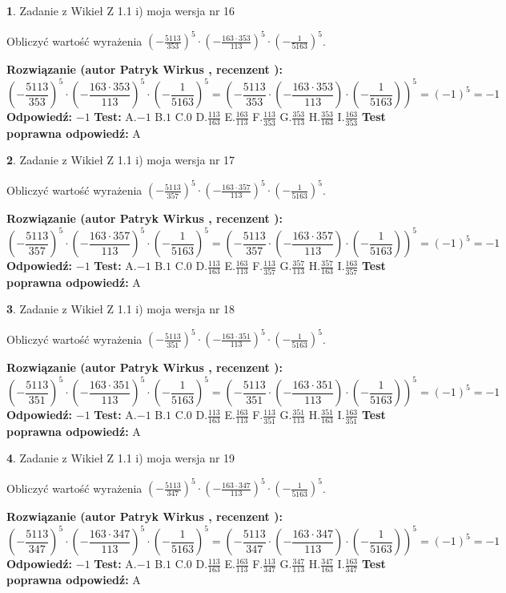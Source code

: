 \documentclass[12pt, a4paper]{article}
\theoremstyle{definition} %
\newtheorem{zad}{}
\newcommand{\zadStart}[1]{\begin{zad}#1\newline}
\newcommand{\zadStop}{\end{zad}}
\newcommand{\rozwStart}[2]{\noindent \textbf{Rozwiązanie (autor #1 , recenzent #2): }\newline}
\newcommand{\rozwStop}{\newline}
\newcommand{\odpStart}{\noindent \textbf{Odpowiedź:}\newline}
\newcommand{\odpStop}{\newline}
\newcommand{\testStart}{\noindent \textbf{Test:}\newline}
\newcommand{\testStop}{\newline}
\newcommand{\kluczStart}{\noindent \textbf{Test poprawna odpowiedź:}\newline}
\newcommand{\kluczStop}{\newline}
\begin{document}
\zadStart{Zadanie z Wikieł Z 1.1 i) moja wersja nr 16}

Obliczyć wartość wyrażenia $(-\frac{5113}{353})^{5} \cdot (-\frac{163 \cdot 353}{113})^{5} \cdot (-\frac{1}{5163})^{5}$.
\zadStop
\rozwStart{Patryk Wirkus}{}
$$(-\frac{5113}{353})^{5} \cdot (-\frac{163 \cdot 353}{113})^{5} \cdot (-\frac{1}{5163})^{5} = (-\frac{5113}{353} \cdot (-\frac{163 \cdot 353}{113}) \cdot (-\frac{1}{5163}))^{5} = (-1)^{5} = -1$$
\rozwStop
\odpStart
$-1$
\odpStop
\testStart
A.$-1$ B.$1$ C.$0$ D.$\frac{113}{163}$ E.$\frac{163}{113}$
F.$\frac{113}{353}$ G.$\frac{353}{113}$
H.$\frac{353}{163}$
I.$\frac{163}{353}$
\testStop
\kluczStart
A
\kluczStop



\zadStart{Zadanie z Wikieł Z 1.1 i) moja wersja nr 17}

Obliczyć wartość wyrażenia $(-\frac{5113}{357})^{5} \cdot (-\frac{163 \cdot 357}{113})^{5} \cdot (-\frac{1}{5163})^{5}$.
\zadStop
\rozwStart{Patryk Wirkus}{}
$$(-\frac{5113}{357})^{5} \cdot (-\frac{163 \cdot 357}{113})^{5} \cdot (-\frac{1}{5163})^{5} = (-\frac{5113}{357} \cdot (-\frac{163 \cdot 357}{113}) \cdot (-\frac{1}{5163}))^{5} = (-1)^{5} = -1$$
\rozwStop
\odpStart
$-1$
\odpStop
\testStart
A.$-1$ B.$1$ C.$0$ D.$\frac{113}{163}$ E.$\frac{163}{113}$
F.$\frac{113}{357}$ G.$\frac{357}{113}$
H.$\frac{357}{163}$
I.$\frac{163}{357}$
\testStop
\kluczStart
A
\kluczStop



\zadStart{Zadanie z Wikieł Z 1.1 i) moja wersja nr 18}

Obliczyć wartość wyrażenia $(-\frac{5113}{351})^{5} \cdot (-\frac{163 \cdot 351}{113})^{5} \cdot (-\frac{1}{5163})^{5}$.
\zadStop
\rozwStart{Patryk Wirkus}{}
$$(-\frac{5113}{351})^{5} \cdot (-\frac{163 \cdot 351}{113})^{5} \cdot (-\frac{1}{5163})^{5} = (-\frac{5113}{351} \cdot (-\frac{163 \cdot 351}{113}) \cdot (-\frac{1}{5163}))^{5} = (-1)^{5} = -1$$
\rozwStop
\odpStart
$-1$
\odpStop
\testStart
A.$-1$ B.$1$ C.$0$ D.$\frac{113}{163}$ E.$\frac{163}{113}$
F.$\frac{113}{351}$ G.$\frac{351}{113}$
H.$\frac{351}{163}$
I.$\frac{163}{351}$
\testStop
\kluczStart
A
\kluczStop



\zadStart{Zadanie z Wikieł Z 1.1 i) moja wersja nr 19}

Obliczyć wartość wyrażenia $(-\frac{5113}{347})^{5} \cdot (-\frac{163 \cdot 347}{113})^{5} \cdot (-\frac{1}{5163})^{5}$.
\zadStop
\rozwStart{Patryk Wirkus}{}
$$(-\frac{5113}{347})^{5} \cdot (-\frac{163 \cdot 347}{113})^{5} \cdot (-\frac{1}{5163})^{5} = (-\frac{5113}{347} \cdot (-\frac{163 \cdot 347}{113}) \cdot (-\frac{1}{5163}))^{5} = (-1)^{5} = -1$$
\rozwStop
\odpStart
$-1$
\odpStop
\testStart
A.$-1$ B.$1$ C.$0$ D.$\frac{113}{163}$ E.$\frac{163}{113}$
F.$\frac{113}{347}$ G.$\frac{347}{113}$
H.$\frac{347}{163}$
I.$\frac{163}{347}$
\testStop
\kluczStart
A
\kluczStop
\end{document}
